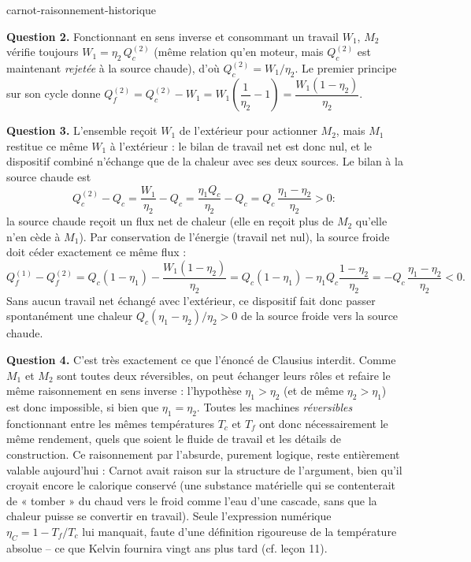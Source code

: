 \begin{exo}{carnot-raisonnement-historique}
\begin{solution}
\textbf{Question 2.} Fonctionnant en sens inverse et consommant un travail $W_1$, $M_2$ vérifie toujours $W_1 = \eta_2\, Q_c^{(2)}$ (même relation qu'en moteur, mais $Q_c^{(2)}$ est maintenant \emph{rejetée} à la source chaude), d'où $Q_c^{(2)} = W_1/\eta_2$. Le premier principe sur son cycle donne $Q_f^{(2)} = Q_c^{(2)} - W_1 = W_1\left(\dfrac{1}{\eta_2} - 1\right) = \dfrac{W_1(1-\eta_2)}{\eta_2}$.

\textbf{Question 3.} L'ensemble reçoit $W_1$ de l'extérieur pour actionner $M_2$, mais $M_1$ restitue ce même $W_1$ à l'extérieur : le bilan de travail net est donc nul, et le dispositif combiné n'échange que de la chaleur avec ses deux sources. Le bilan à la source chaude est
\[
Q_c^{(2)} - Q_c = \frac{W_1}{\eta_2} - Q_c = \frac{\eta_1 Q_c}{\eta_2} - Q_c = Q_c\,\frac{\eta_1-\eta_2}{\eta_2} > 0 :
\]
la source chaude reçoit un flux net de chaleur (elle en reçoit plus de $M_2$ qu'elle n'en cède à $M_1$). Par conservation de l'énergie (travail net nul), la source froide doit céder exactement ce même flux :
\[
Q_f^{(1)} - Q_f^{(2)} = Q_c(1-\eta_1) - \frac{W_1(1-\eta_2)}{\eta_2} = Q_c(1-\eta_1) - \eta_1 Q_c\frac{1-\eta_2}{\eta_2} = -Q_c\,\frac{\eta_1-\eta_2}{\eta_2} < 0.
\]
Sans aucun travail net échangé avec l'extérieur, ce dispositif fait donc passer spontanément une chaleur $Q_c(\eta_1-\eta_2)/\eta_2 > 0$ de la source froide vers la source chaude.

\textbf{Question 4.} C'est très exactement ce que l'énoncé de Clausius interdit. Comme $M_1$ et $M_2$ sont toutes deux réversibles, on peut échanger leurs rôles et refaire le même raisonnement en sens inverse : l'hypothèse $\eta_1 > \eta_2$ (et de même $\eta_2 > \eta_1$) est donc impossible, si bien que $\eta_1 = \eta_2$. Toutes les machines \emph{réversibles} fonctionnant entre les mêmes températures $T_c$ et $T_f$ ont donc nécessairement le même rendement, quels que soient le fluide de travail et les détails de construction. Ce raisonnement par l'absurde, purement logique, reste entièrement valable aujourd'hui : Carnot avait raison sur la structure de l'argument, bien qu'il croyait encore le calorique conservé (une substance matérielle qui se contenterait de « tomber » du chaud vers le froid comme l'eau d'une cascade, sans que la chaleur puisse se convertir en travail). Seule l'expression numérique $\eta_C = 1 - T_f/T_c$ lui manquait, faute d'une définition rigoureuse de la température absolue -- ce que Kelvin fournira vingt ans plus tard (cf. leçon 11).
\end{solution}
\end{exo}


